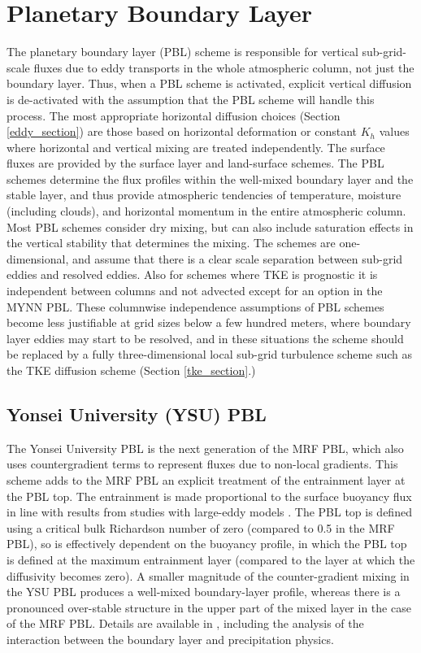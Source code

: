 \section{Planetary Boundary Layer}

The planetary boundary layer (PBL) scheme is responsible for vertical sub-grid-scale 
fluxes due to eddy transports in the whole atmospheric column, not just the 
boundary layer. Thus, when a PBL scheme is activated, explicit vertical 
diffusion is de-activated with the assumption that the PBL scheme will 
handle this process. The most appropriate horizontal diffusion choices
(Section \ref{eddy_section}) are those based on horizontal deformation
or constant $K_h$ values where horizontal and vertical mixing are treated
independently. The surface fluxes are provided by the surface layer 
and land-surface schemes. The PBL schemes determine the flux profiles 
within the well-mixed boundary layer and the stable layer, and thus provide 
atmospheric tendencies of temperature, moisture (including clouds), and 
horizontal momentum in the entire atmospheric column. Most PBL schemes 
consider dry mixing, but can also include saturation effects in the vertical 
stability that determines the mixing. The schemes are one-dimensional, and 
assume that there is a clear scale separation between sub-grid eddies and 
resolved eddies. Also for schemes where TKE is prognostic it is independent
between columns and not advected except for an option in the MYNN PBL.
These columnwise independence assumptions of PBL schemes become 
less justifiable at grid sizes below a 
few hundred meters, where boundary layer eddies may start to be resolved, and
in these situations the scheme should be replaced by a fully three-dimensional
local sub-grid turbulence scheme such as the TKE diffusion scheme (Section
\ref{tke_section}.)

\subsection{Yonsei University (YSU) PBL}

The Yonsei University PBL \citep{hong06} is the next generation of the MRF PBL, which also uses countergradient terms to represent fluxes due to non-local gradients. This scheme adds to the MRF PBL \citep{hong96} an explicit treatment of the entrainment layer at the PBL top. The entrainment is made proportional to the surface buoyancy flux in line with results from studies with large-eddy models \citep{noh03}. The PBL top is defined using a critical bulk Richardson number of zero (compared to 0.5 in the MRF PBL), so is effectively dependent on the buoyancy profile, in which the PBL top is defined at the maximum entrainment layer (compared to the layer at which the diffusivity becomes zero). A smaller magnitude of the counter-gradient mixing in the YSU PBL produces a well-mixed boundary-layer profile, whereas there is a pronounced over-stable structure in the upper part of the mixed layer in the case of the MRF PBL. Details are available in \citet{hong06}, including the analysis of the interaction between the boundary layer and precipitation physics. 

